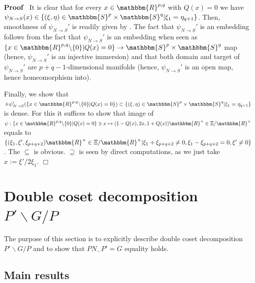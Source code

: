 \documentclass{article}
\newcommand{\assign}{:=}
\newenvironment{proof}{\noindent\textbf{Proof\ }}{\hspace*{\fill}$\Box$\medskip}
\numberwithin{definition}{section}
\numberwithin{lemma}{section}
\numberwithin{proposition}{section}
{\theorembodyfont{\rmfamily}\newtheorem{remark}{Remark}
\numberwithin{remark}{section}
}
\begin{document}
\begin{proof}
  It is clear that for every $x \in \mathbbm{R}^{p, q}$ with $Q ( x) = 0$ we
  have $\psi_{N \rightarrow S} ( x) \in \{ ( \xi, \eta) \in \mathbbm{S}^p
  \times \mathbbm{S}^q | \xi_1 = \eta_{q + 1} \}$. Then, smoothness of
  $\psi_{N \rightarrow S}'$ is readily given by {\cite[thm.
  1.32]{warner1971foundations}}. The fact that $\psi_{N \rightarrow S}'$ is an
  embedding follows from the fact that $\psi_{N \rightarrow S}'$ is an
  embedding when seen as $\{ x \in \mathbbm{R}^{p, q} \backslash \{ 0 \} | Q (
  x) = 0 \} \rightarrow \mathbbm{S}^p \times \mathbbm{S}^q$ map (hence,
  $\psi_{N \rightarrow S}'$ is an injective immersion) and that both domain
  and target of $\psi_{N \rightarrow S}'$ are $p + q - 1$-dimensional
  manifolds (hence, $\psi_{N \rightarrow S}'$ is an open map, hence
  homeomorphism into).
  
  Finally, we show that $\pm \psi'_{N \rightarrow S} ( \{ x \in
  \mathbbm{R}^{p, q} \backslash \{ 0 \} | Q ( x) = 0 \}) \subset \{ ( \xi,
  \eta) \in \mathbbm{S}^p \times \mathbbm{S}^q | \xi_1 = \eta_{q + 1} \}$ is
  dense. For this it suffices to show that image of $\psi : \{ x \in
  \mathbbm{R}^{p, q} \backslash \{ 0 \} | Q ( x) = 0 \} \ni x \mapsto ( 1 - Q
  ( x), 2 x, 1 + Q ( x)) \mathbbm{R}^{\times} \in \Xi /\mathbbm{R}^{\times}$
  equals to $\{ ( \xi_1, \xi', \xi_{p + q + 2}) \mathbbm{R}^{\times} \in \Xi
  /\mathbbm{R}^{\times} | \xi_1 + \xi_{p + q + 2} \neq 0, \xi_1 - \xi_{p + q +
  2} = 0, \xi' \neq 0 \}$. The $\subseteq$ is obvious. $\supseteq$ is seen by
  direct computations, as we just take $x \assign \xi' / 2 \xi_1$.
\end{proof}

\section{Double coset decomposition $P' \backslash G /
P$}\label{sec:doublePGP}

The purpose of this section is to explicitly describe double coset
decomposition $P' \backslash G / P$ and to show that $P N_- P' = G$ equality
holds.

\subsection{Main results}
\end{document}
